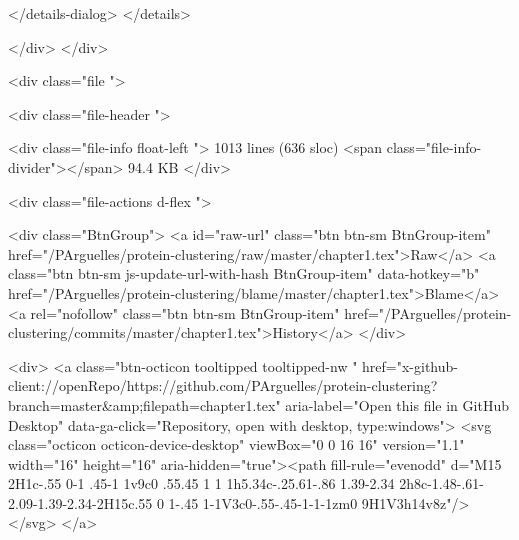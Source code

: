   </details-dialog>
</details>
      
    </div>
  </div>





    <div class="file ">
      
<div class="file-header ">

  <div class="file-info float-left ">
      1013 lines (636 sloc)
      <span class="file-info-divider"></span>
    94.4 KB
  </div>

  <div class="file-actions d-flex ">

    <div class="BtnGroup">
      <a id="raw-url" class="btn btn-sm BtnGroup-item" href="/PArguelles/protein-clustering/raw/master/chapter1.tex">Raw</a>
        <a class="btn btn-sm js-update-url-with-hash BtnGroup-item" data-hotkey="b" href="/PArguelles/protein-clustering/blame/master/chapter1.tex">Blame</a>
      <a rel="nofollow" class="btn btn-sm BtnGroup-item" href="/PArguelles/protein-clustering/commits/master/chapter1.tex">History</a>
    </div>


    <div>
            <a class="btn-octicon tooltipped tooltipped-nw "
               href="x-github-client://openRepo/https://github.com/PArguelles/protein-clustering?branch=master&amp;filepath=chapter1.tex"
               aria-label="Open this file in GitHub Desktop"
               data-ga-click="Repository, open with desktop, type:windows">
                <svg class="octicon octicon-device-desktop" viewBox="0 0 16 16" version="1.1" width="16" height="16" aria-hidden="true"><path fill-rule="evenodd" d="M15 2H1c-.55 0-1 .45-1 1v9c0 .55.45 1 1 1h5.34c-.25.61-.86 1.39-2.34 2h8c-1.48-.61-2.09-1.39-2.34-2H15c.55 0 1-.45 1-1V3c0-.55-.45-1-1-1zm0 9H1V3h14v8z"/></svg>
            </a>

